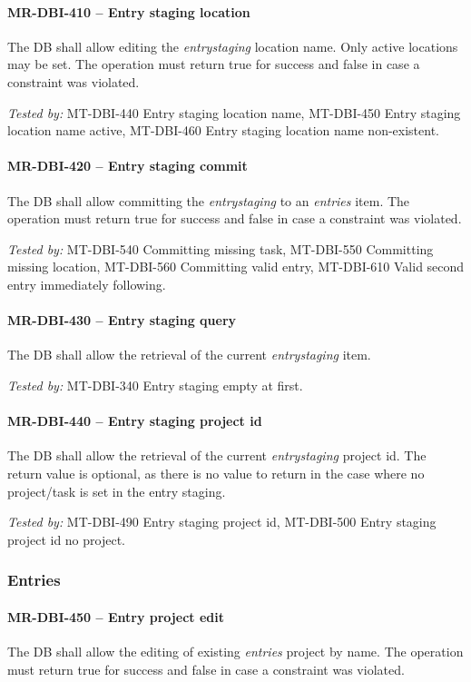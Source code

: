\paragraph{MR-DBI-410 -- Entry staging location}
The \gls{DB} shall allow editing the \emph{entrystaging} location name.
Only active locations may be set.
The operation must return true for success and false in case a
constraint was violated.

\textit{Tested by: } MT-DBI-440 Entry staging location name,
MT-DBI-450 Entry staging location name active,
MT-DBI-460 Entry staging location name non-existent.

\paragraph{MR-DBI-420 -- Entry staging commit}
The \gls{DB} shall allow committing the \emph{entrystaging} to an
\emph{entries} item.
The operation must return true for success and false in case a
constraint was violated.

\textit{Tested by: } MT-DBI-540 Committing missing task,
MT-DBI-550 Committing missing location,
MT-DBI-560 Committing valid entry,
MT-DBI-610 Valid second entry immediately following.

\paragraph{MR-DBI-430 -- Entry staging query}
The \gls{DB} shall allow the retrieval of the current \emph{entrystaging} item.

\textit{Tested by: } MT-DBI-340 Entry staging empty at first.

\paragraph{MR-DBI-440 -- Entry staging project id}
The \gls{DB} shall allow the retrieval of the current \emph{entrystaging}
project id. The return value is optional, as there is no value to
return in the case where no project/task is set in the entry staging.

\textit{Tested by: } MT-DBI-490 Entry staging project id,
MT-DBI-500 Entry staging project id no project.

\subsubsection{Entries}
\paragraph{MR-DBI-450 -- Entry project edit}
The \gls{DB} shall allow the editing of existing \emph{entries} project
by name.
The operation must return true for success and false in case a
constraint was violated.


